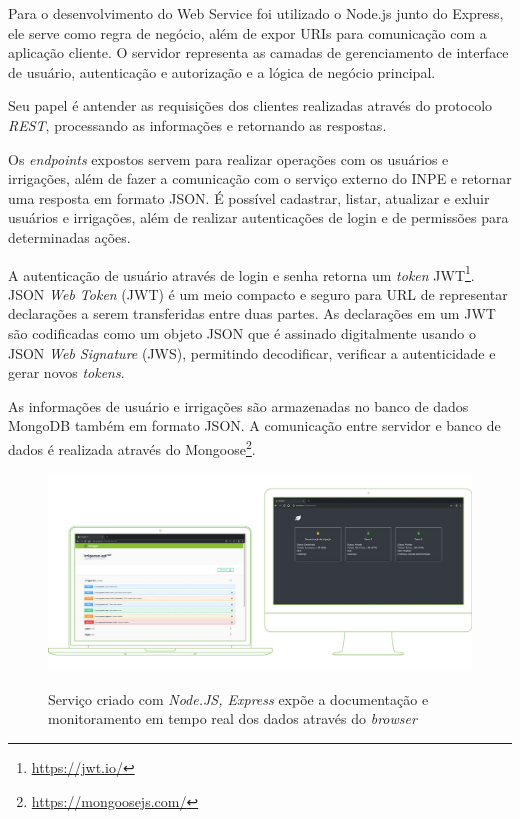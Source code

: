 \documentclass[
	12pt,				%
	openright,			%
	twoside,			%
	a4paper,			%
	english,			%
	brazil				%
	]{abntex2}
\begin{document}
Para o desenvolvimento do Web Service foi utilizado o Node.js junto do Express, ele serve como regra de negócio, além de expor URIs para comunicação com a aplicação cliente. O servidor representa as camadas de gerenciamento de interface de usuário, autenticação e autorização e a lógica de negócio principal.

Seu papel é antender as requisições dos clientes realizadas através do protocolo \textit{REST}, processando as informações e retornando as respostas.

Os \textit{endpoints} expostos servem para realizar operações com os usuários e irrigações, além de fazer a comunicação com o serviço externo do INPE e retornar uma resposta em formato JSON. É possível cadastrar, listar, atualizar e exluir usuários e irrigações, além de realizar autenticações de login e de permissões para determinadas ações. 

A autenticação de usuário através de login e senha retorna um \textit{token} JWT\footnote{\url{https://jwt.io/}}. JSON \textit{Web Token} (JWT) é um meio compacto e seguro para URL de representar declarações a serem transferidas entre duas partes. As declarações em um JWT são codificadas como um objeto JSON que é assinado digitalmente usando o JSON \textit{Web Signature} (JWS), permitindo decodificar, verificar a autenticidade e gerar novos \textit{tokens}.

As informações de usuário e irrigações são armazenadas no banco de dados MongoDB também em formato JSON. A comunicação entre servidor e banco de dados é realizada através do Mongoose\footnote{\url{https://mongoosejs.com/}}.

\begin{figure}[h]
	\centering

    \caption{Serviço criado com \textit{Node.JS, Express} expõe a documentação e monitoramento em tempo real dos dados através do \textit{browser}} \label{fig:ServerAppExample}
    \includegraphics[scale=0.46]{server-app} \\

\end{figure}
\end{document}
